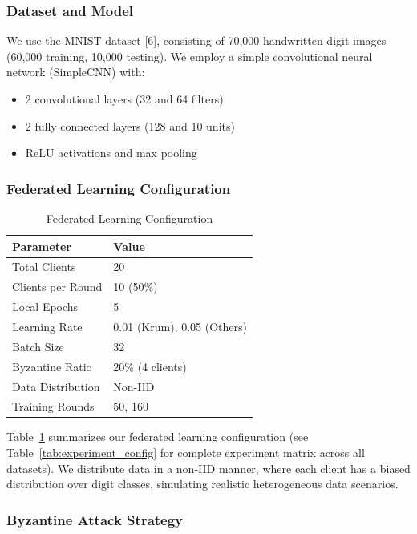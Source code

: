 \documentclass[12pt,a4paper,onecolumn]{article}
\begin{document}
\subsubsection{Dataset and Model}

We use the MNIST dataset [6], consisting of 70,000 handwritten digit images (60,000 training, 10,000 testing). We employ a simple convolutional neural network (SimpleCNN) with:
\begin{itemize}
    \item 2 convolutional layers (32 and 64 filters)
    \item 2 fully connected layers (128 and 10 units)
    \item ReLU activations and max pooling
\end{itemize}

\subsubsection{Federated Learning Configuration}

\begin{table}[t]
\caption{Federated Learning Configuration}
\label{tab:fl_config}
\centering
\begin{tabular}{ll}
\toprule
\textbf{Parameter} & \textbf{Value} \\
\midrule
Total Clients & 20 \\
Clients per Round & 10 (50\%) \\
Local Epochs & 5 \\
Learning Rate & 0.01 (Krum), 0.05 (Others) \\
Batch Size & 32 \\
Byzantine Ratio & 20\% (4 clients) \\
Data Distribution & Non-IID \\
Training Rounds & 50, 160 \\
\bottomrule
\end{tabular}
\end{table}

Table~\ref{tab:fl_config} summarizes our federated learning configuration (see Table~\ref{tab:experiment_config} for complete experiment matrix across all datasets). We distribute data in a non-IID manner, where each client has a biased distribution over digit classes, simulating realistic heterogeneous data scenarios.

\subsubsection{Byzantine Attack Strategy}
\end{document}
